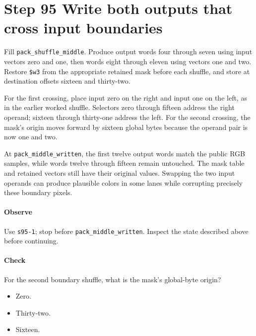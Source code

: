\section{Step 95 Write both outputs that cross input boundaries}
Fill \texttt{pack\_shuffle\_middle}. Produce output words four through seven using input vectors zero and one, then words eight through eleven using vectors one and two. Restore \texttt{\$w3} from the appropriate retained mask before each shuffle, and store at destination offsets sixteen and thirty-two.

For the first crossing, place input zero on the right and input one on the left, as in the earlier worked shuffle. Selectors zero through fifteen address the right operand; sixteen through thirty-one address the left. For the second crossing, the mask’s origin moves forward by sixteen global bytes because the operand pair is now one and two.

At \texttt{pack\_middle\_written}, the first twelve output words match the public RGB samples, while words twelve through fifteen remain untouched. The mask table and retained vectors still have their original values. Swapping the two input operands can produce plausible colors in some lanes while corrupting precisely these boundary pixels.

\paragraph{Observe} Use \texttt{s95-1}; stop before \texttt{pack\_middle\_written}. Inspect the state described above before continuing.

\paragraph{Check} For the second boundary shuffle, what is the mask’s global-byte origin?
\begin{itemize}
  \item[A.] Zero.
  \item[B.] Thirty-two.
  \item[C.] Sixteen.
\end{itemize}
